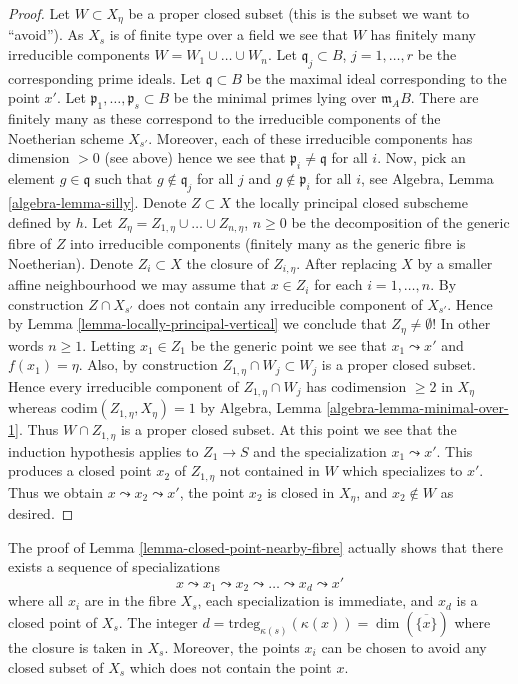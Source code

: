 \begin{proof}
\medskip\noindent
Let $W \subset X_\eta$ be a proper closed subset (this is the
subset we want to ``avoid''). As $X_s$ is of finite type over a field
we see that $W$ has finitely many irreducible components
$W = W_1 \cup \ldots \cup W_n$. Let
$\mathfrak q_j \subset B$, $j = 1, \ldots, r$
be the corresponding prime ideals. Let $\mathfrak q \subset B$
be the maximal ideal corresponding to the point $x'$.
Let $\mathfrak p_1, \ldots, \mathfrak p_s \subset B$ be the
minimal primes lying over $\mathfrak m_AB$. There are finitely
many as these correspond to the irreducible components of the
Noetherian scheme $X_{s'}$. Moreover, each of these irreducible
components has dimension $> 0$ (see above) hence we see that
$\mathfrak p_i \not = \mathfrak q$ for all $i$.
Now, pick an element $g \in \mathfrak q$ such that
$g \not \in \mathfrak q_j$ for all $j$ and $g \not \in \mathfrak p_i$
for all $i$, see
Algebra, Lemma \ref{algebra-lemma-silly}.
Denote $Z \subset X$ the locally principal closed subscheme defined by $h$.
Let $Z_\eta = Z_{1, \eta} \cup \ldots \cup Z_{n, \eta}$, $n \geq 0$
be the decomposition of the generic fibre of $Z$ into irreducible
components (finitely many as the generic fibre is Noetherian).
Denote $Z_i \subset X$ the closure of $Z_{i, \eta}$.
After replacing $X$ by a smaller affine neighbourhood
we may assume that $x \in Z_i$ for each $i = 1, \ldots, n$.
By construction $Z \cap X_{s'}$ does not contain any irreducible
component of $X_{s'}$. Hence by
Lemma \ref{lemma-locally-principal-vertical}
we conclude that $Z_\eta \not = \emptyset$! In other words
$n \geq 1$. Letting $x_1 \in Z_1$ be the generic point we see
that $x_1 \leadsto x'$ and $f(x_1) = \eta$.
Also, by construction $Z_{1, \eta} \cap W_j \subset W_j$
is a proper closed subset. Hence every irreducible component of
$Z_{1, \eta} \cap W_j$ has codimension $\geq 2$ in $X_\eta$
whereas $\text{codim}(Z_{1, \eta}, X_\eta) = 1$ by
Algebra, Lemma \ref{algebra-lemma-minimal-over-1}.
Thus $W \cap Z_{1, \eta}$ is a proper closed subset.
At this point we see that the induction hypothesis applies to
$Z_1 \to S$ and the specialization $x_1 \leadsto x'$.
This produces a closed point $x_2$ of $Z_{1, \eta}$ not contained
in $W$ which specializes to $x'$. Thus we obtain
$x \leadsto x_2 \leadsto x'$, the point $x_2$ is closed in $X_\eta$,
and $x_2 \not \in W$ as desired.
\end{proof}

\begin{remark}
\label{remark-full-specialization-sequence}
The proof of
Lemma \ref{lemma-closed-point-nearby-fibre}
actually shows that there exists a sequence of specializations
$$
x \leadsto x_1 \leadsto x_2 \leadsto \ldots \leadsto x_d \leadsto x'
$$
where all $x_i$ are in the fibre $X_s$, each specialization is
immediate, and $x_d$ is a closed point of $X_s$. The integer
$d = \text{trdeg}_{\kappa(s)}(\kappa(x)) = \dim(\overline{\{x\}})$
where the closure is taken in $X_s$. Moreover, the points
$x_i$ can be chosen to avoid any closed subset of $X_s$ which
does not contain the point $x$.
\end{remark}

